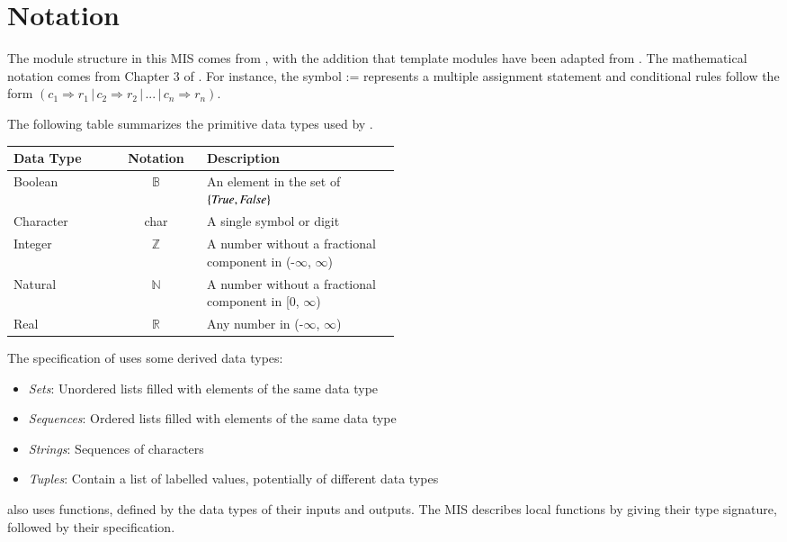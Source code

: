 \section{Notation}

The module structure in this MIS comes from \citet{HoffmanAndStrooper1995},
with the addition that template modules have been adapted from
\cite{ghezzifundamentals2003}.  The mathematical notation comes from Chapter 3
of \citet{HoffmanAndStrooper1995}.  For instance, the symbol := represents a
multiple assignment statement and conditional rules follow the form $(c_1
\Rightarrow r_1 \, | \, c_2 \Rightarrow r_2 \, | \, ... \, | \, c_n \Rightarrow
r_n )$.

The following table summarizes the primitive data types used by \progname.

\begin{center}
    \renewcommand{\arraystretch}{1.2}
    \noindent
    \begin{tabular}{l c p{0.5\linewidth}}
        \toprule
        \textbf{Data Type} & \textbf{Notation} & \textbf{Description}\\
        \midrule

        \rowcolor[gray]{0.9}Boolean & $\mathbb{B}$ & An element in the set of
        $\{ \mathit{True}, \mathit{False} \}$ \\

        Character & char & A single symbol or digit \\

        \rowcolor[gray]{0.9}Integer & $\mathbb{Z}$ & A number without a
        fractional component in (-$\infty$, $\infty$) \\

        Natural & $\mathbb{N}$ & A number without a fractional component in [0,
        $\infty$) \\

        \rowcolor[gray]{0.9}Real & $\mathbb{R}$ & Any number in (-$\infty$,
        $\infty$)\\

        \bottomrule
    \end{tabular}
\end{center}

\noindent
The specification of \progname{} uses some derived data types:
\begin{itemize}

    \item \textit{Sets}: Unordered lists filled with elements of the same data
    type

    \item \textit{Sequences}: Ordered lists filled with elements of the same
    data type

    \item \textit{Strings}: Sequences of characters

    \item \textit{Tuples}: Contain a list of labelled values, potentially of
    different data types

\end{itemize}

\progname{} also uses functions, defined by the data types of their inputs and
outputs. The MIS describes local functions by giving their type signature,
followed by their specification.